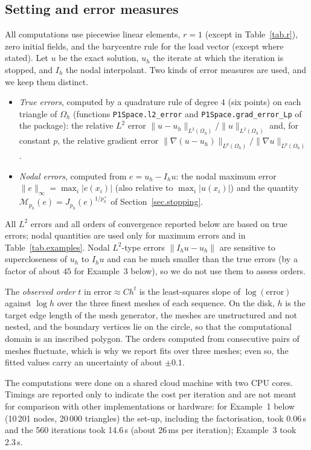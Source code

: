 \documentclass[11pt]{amsart}
\theoremstyle{definition}
\theoremstyle{remark}
\numberwithin{equation}{section}
\begin{document}
\subsection{Setting and error measures}\label{sec.measures}
All computations use piecewise linear elements, $r=1$ (except in Table~\ref{tab.r}), zero initial fields, and the barycentre rule for the load vector (except where stated). Let $u$ be the exact solution, $u_h$ the iterate at which the iteration is stopped, and $I_h$ the nodal interpolant. Two kinds of error measures are used, and we keep them distinct.
\begin{itemize}
\item \emph{True errors}, computed by a quadrature rule of degree $4$ (six points) on each triangle of $\Omega_h$ (functions \texttt{P1Space.l2\_error} and \texttt{P1Space.grad\_error\_Lp} of the package): the relative $L^2$ error $\|u-u_h\|_{L^2(\Omega_h)}/\|u\|_{L^2(\Omega_h)}$ and, for constant $p$, the relative gradient error $\|\nabla(u-u_h)\|_{L^p(\Omega_h)}/\|\nabla u\|_{L^p(\Omega_h)}$.
\item \emph{Nodal errors}, computed from $e=u_h-I_hu$: the nodal maximum error $\|e\|_\infty=\max_i|e(x_i)|$ (also relative to $\max_i|u(x_i)|$) and the quantity $\mathcal M_{p_h}(e)=J_{p_h}(e)^{1/p_h^+}$ of Section~\ref{sec.stopping}.
\end{itemize}
All $L^2$ errors and all orders of convergence reported below are based on true errors; nodal quantities are used only for maximum errors and in Table~\ref{tab.examples}. Nodal $L^2$-type errors $\|I_hu-u_h\|$ are sensitive to supercloseness of $u_h$ to $I_hu$ and can be much smaller than the true errors (by a factor of about $45$ for Example~3 below), so we do not use them to assess orders.

The \emph{observed order} $t$ in $\text{error}\approx Ch^t$ is the least-squares slope of $\log(\text{error})$ against $\log h$ over the three finest meshes of each sequence. On the disk, $h$ is the target edge length of the mesh generator, the meshes are unstructured and not nested, and the boundary vertices lie on the circle, so that the computational domain is an inscribed polygon. The orders computed from consecutive pairs of meshes fluctuate, which is why we report fits over three meshes; even so, the fitted values carry an uncertainty of about $\pm0.1$.

The computations were done on a shared cloud machine with two CPU cores. Timings are reported only to indicate the cost per iteration and are not meant for comparison with other implementations or hardware: for Example~1 below (10\,201 nodes, 20\,000 triangles) the set-up, including the factorisation, took 0.06\,s and the 560 iterations took 14.6\,s (about 26\,ms per iteration); Example~3 took 2.3\,s.
\end{document}
